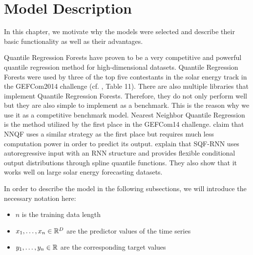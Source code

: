 \chapter{Model Description}
\label{ch:model-description}

In this chapter, we motivate why the models were selected and 
describe their basic functionality as well as their advantages.

Quantile Regression Forests have proven to be a very competitive 
and powerful quantile regression method for high-dimensional datasets. 
Quantile Regression Forests were used by three of the top five contestants 
in the solar energy track in the GEFCom2014 challenge (cf. \Textcite{Hong2016}, Table 11). 
There are also multiple libraries that implement Quantile Regression Forests.
Therefore, they do not only perform 
well but they are also simple to implement as a benchmark.
This is the reason why we use it as a competitive benchmark model.
Nearest Neighbor Quantile Regression is the method utilized by the first place 
in the GEFCom14 challenge. \Textcite{Ordiano2019} claim that NNQF 
uses a similar strategy as the first place but requires much less 
computation power in order to predict its output. 
\Textcite{Gasthaus2019} explain that SQF-RNN uses autoregressive input with an RNN structure and provides flexible 
conditional output distributions through spline quantile functions. 
They also show that it works well on large solar energy 
forecasting datasets.

In order to describe the model in the following subsections, we will introduce the necessary notation here:
\begin{itemize}
    \item \(n\) is the training data length
    \item \(x_1, \ldots, x_n \in \mathbb{R}^D\) are the predictor values of the time series
    \item \(y_1, \ldots, y_n \in \mathbb{R}\) are the corresponding target values
\end{itemize}





